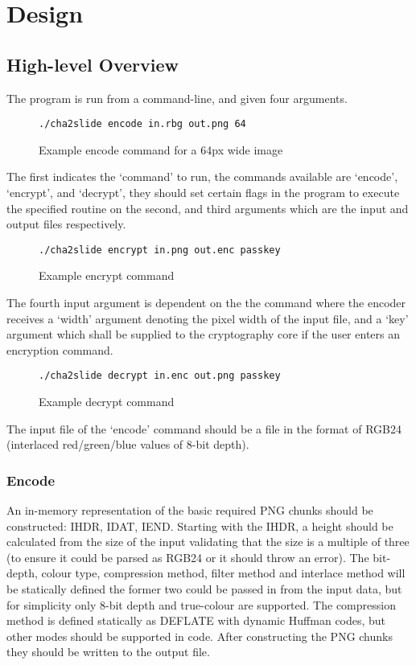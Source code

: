 \documentclass{report}
\begin{document}
\chapter{Design}

\section{High-level Overview}

The program is run from a command-line, and given four arguments. 
\begin{figure}[!htb]
  \begin{verbatim}./cha2slide encode in.rbg out.png 64\end{verbatim}
  \caption{Example encode command for a 64px wide image}\label{fig:example_encode_cmd}
\end{figure}
The first indicates the `command' to run, the commands available are `encode', `encrypt', and `decrypt', they should set certain flags in the program to execute the specified routine on the second, and third arguments which are the input and output files respectively.
\begin{figure}[!htb]
  \begin{verbatim}./cha2slide encrypt in.png out.enc passkey\end{verbatim}
  \caption{Example encrypt command}\label{fig:example_encrypt_cmd}
\end{figure}
The fourth input argument is dependent on the the command where the encoder receives a `width' argument denoting the pixel width of the input file, and a `key' argument which shall be supplied to the cryptography core if the user enters an encryption command.
\begin{figure}[!htb]
  \begin{verbatim}./cha2slide decrypt in.enc out.png passkey\end{verbatim}
  \caption{Example decrypt command}\label{fig:example_decrypt_cmd}
\end{figure}
The input file of the `encode' command should be a file in the format of RGB24 (interlaced red/green/blue values of 8-bit depth).

\subsection{Encode}

An in-memory representation of the basic required PNG chunks should be constructed: IHDR, IDAT, IEND. Starting with the IHDR, a height should be calculated from the size of the input validating that the size is a multiple of three (to ensure it could be parsed as RGB24 or it should throw an error). The bit-depth, colour type, compression method, filter method and interlace method will be statically defined the former two could be passed in from the input data, but for simplicity only 8-bit depth and true-colour are supported. The compression method is defined statically as DEFLATE with dynamic Huffman codes, but other modes should be supported in code. After constructing the PNG chunks they should be written to the output file.
\end{document}
